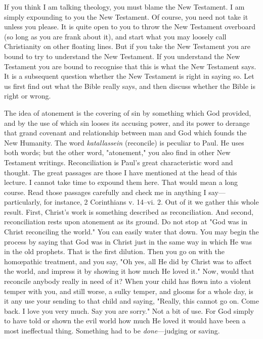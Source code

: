 \documentclass[draft]{ptfdoc}
\begin{document}
If you think I am talking theology, you must 
blame the New Testament. I am simply expounding 
to you the New Testament. Of course, 
you need not take it unless you please. It is 
quite open to you to throw the New Testament 
overboard (so long as you are frank 
about it), and start what you may loosely call 
Christianity on other floating lines. But if you 
take the New Testament you are bound to try to 
understand the New Testament. If you understand 
the New Testament you are bound to 
recognise that this is what the New Testament 
says. It is a subsequent question whether the 
New Testament is right in saying so. Let us 
first find out what the Bible really says, and then 
discuss whether the Bible is right or wrong. 

The idea of atonement is the covering of sin 
by something which God provided, and by the 
use of which sin looses its accusing power, and 
its power to derange that grand covenant and 
relationship between man and God which founds 
the New Humanity. The word \textit{katallassein} (reconcile) 
is peculiar to Paul. He uses both words; 
but the other word, "atonement," you also find in 
other New Testament writings. Reconciliation 
is Paul's great characteristic word and thought. 
The great passages are those I have mentioned 
at the head of this lecture. I cannot take time 
to expound them here. That would mean a long 
course. Read those passages carefully and 
check me in anything I say---particularly, for 
instance, 2 Corinthians v. 14--vi. 2. Out of it we 
gather this whole result. First, Christ's work 
is something described as reconciliation. And 
second, reconciliation rests upon atonement as 
its ground. Do not stop at "God was in Christ 
reconciling the world." You can easily water 
that down. You may begin the process by 
saying that God was in Christ just in the same 
way in which He was in the old prophets. That 
is the first dilution. Then you go on with the 
hom{\oe}pathic treatment, and you say, "Oh yes, 
all He did by Christ was to affect the world, and 
impress it by showing it how much He loved it." 
Now, would that reconcile anybody really in 
need of it? When your child has flown into a 
violent temper with you, and still worse, a sulky 
temper, and glooms for a whole day, is it any 
use your sending to that child and saying, 
"Really, this cannot go on. Come back. I love 
you very much. Say you are sorry." Not 
a bit of use. For God simply to have told 
or shown the evil world how much He loved 
it would have been a most ineffectual thing. 
Something had to be \textit{done}---judging or saving. 
\end{document}
